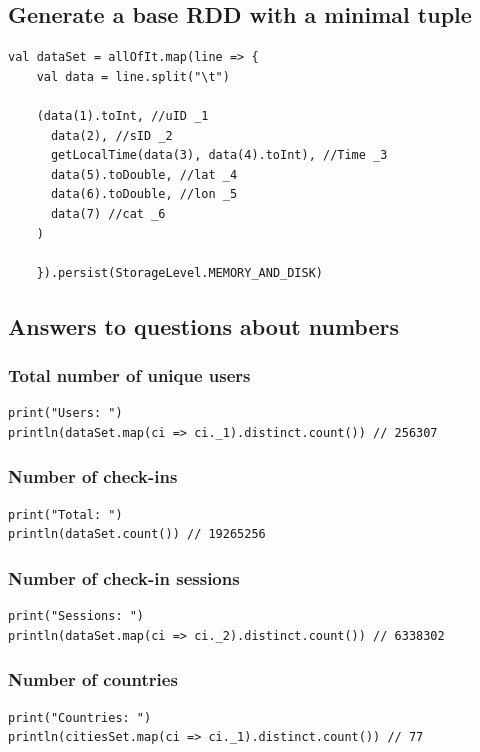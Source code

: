 \documentclass[abstract=on]{article}
\begin{document}
\subsection{Generate a base RDD with a minimal tuple}
\begin{lstlisting}
val dataSet = allOfIt.map(line => {
    val data = line.split("\t")

    (data(1).toInt, //uID _1
      data(2), //sID _2
      getLocalTime(data(3), data(4).toInt), //Time _3
      data(5).toDouble, //lat _4
      data(6).toDouble, //lon _5
      data(7) //cat _6
    )

    }).persist(StorageLevel.MEMORY_AND_DISK)
\end{lstlisting}

\subsection{Answers to questions about numbers}
\subsubsection{Total number of unique users}
\begin{lstlisting}
print("Users: ")
println(dataSet.map(ci => ci._1).distinct.count()) // 256307
\end{lstlisting}

\subsubsection{Number of check-ins}
\begin{lstlisting}
print("Total: ")
println(dataSet.count()) // 19265256
\end{lstlisting}

\subsubsection{Number of check-in sessions}
\begin{lstlisting}
print("Sessions: ")
println(dataSet.map(ci => ci._2).distinct.count()) // 6338302
\end{lstlisting}

\subsubsection{Number of countries}
\begin{lstlisting}
print("Countries: ")
println(citiesSet.map(ci => ci._1).distinct.count()) // 77
\end{lstlisting}
\end{document}
